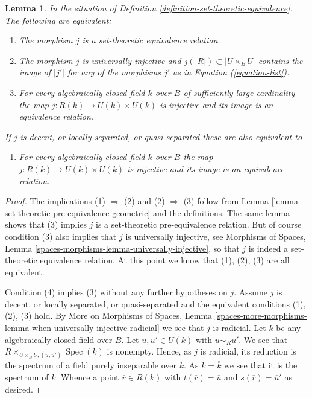 \documentclass[10pt,a4paper]{amsart}
\theoremstyle{plain}
\newtheorem{lemma}[subsection]{Lemma}
\theoremstyle{definition}
\theoremstyle{remark}
\numberwithin{equation}{subsection}
\def\Spec{\mathop{\mathrm{Spec}}}
\begin{document}
\begin{lemma}
\label{lemma-set-theoretic-equivalence-geometric}
In the situation of Definition \ref{definition-set-theoretic-equivalence}.
The following are equivalent:
\begin{enumerate}
\item The morphism $j$ is a set-theoretic equivalence relation.
\item The morphism $j$ is universally injective and
$j(|R|) \subset |U \times_B U|$ contains the image of
$|j'|$ for any of the morphisms $j'$ as in Equation (\ref{equation-list}).
\item For every algebraically closed field $k$ over $B$ of sufficiently large
cardinality the map $j : R(k) \to U(k) \times U(k)$ is injective and
its image is an equivalence relation.
\end{enumerate}
If $j$ is decent, or locally separated, or quasi-separated
these are also equivalent to
\begin{enumerate}
\item[(4)] For every algebraically closed field $k$ over $B$
the map $j : R(k) \to U(k) \times U(k)$ is injective and its image
is an equivalence relation.
\end{enumerate}
\end{lemma}

\begin{proof}
The implications (1) $\Rightarrow$ (2) and (2) $\Rightarrow$ (3) follow from
Lemma \ref{lemma-set-theoretic-pre-equivalence-geometric}
and the definitions. The same lemma shows that (3) implies
$j$ is a set-theoretic pre-equivalence relation. But of course condition
(3) also implies that $j$ is universally injective, see
Morphisms of Spaces, Lemma \ref{spaces-morphisms-lemma-universally-injective},
so that $j$ is indeed a set-theoretic equivalence relation.
At this point we know that (1), (2), (3) are all equivalent.

\medskip\noindent
Condition (4) implies (3) without any further hypotheses on $j$. Assume $j$
is decent, or locally separated, or quasi-separated and the equivalent
conditions (1), (2), (3) hold. By
More on Morphisms of Spaces,
Lemma \ref{spaces-more-morphisms-lemma-when-universally-injective-radicial}
we see that $j$ is radicial.
Let $k$ be any algebraically closed field over $B$. Let
$\overline{u}, \overline{u}' \in U(k)$ with
$\overline{u} \sim_R \overline{u}'$. We see that
$R \times_{U \times_B U, (\overline{u}, \overline{u}')} \Spec(k)$
is nonempty. Hence, as $j$ is radicial, its reduction is the spectrum of a
field purely inseparable over $k$. As $k = \overline{k}$ we see that
it is the spectrum of $k$. Whence a point $\overline{r} \in R(k)$
with $t(\overline{r}) = \overline{u}$ and $s(\overline{r}) = \overline{u}'$
as desired.
\end{proof}
\end{document}
